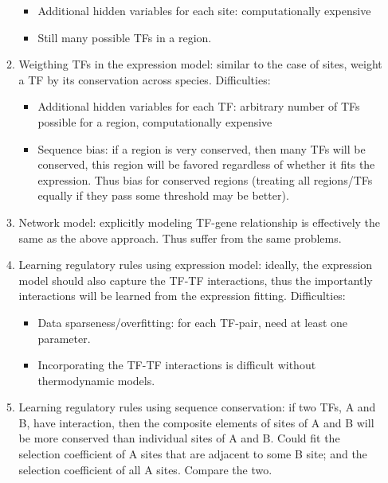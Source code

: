 \documentclass[11pt]{article}
\begin{document}
\begin{enumerate}
\begin{enumerate}
\begin{itemize}
\item Additional hidden variables for each site: computationally expensive
\item Still many possible TFs in a region. 
\end{itemize}
\item Weigthing TFs in the expression model: similar to the case of sites, weight a TF by its conservation across species. Difficulties: 
\begin{itemize}
\item Additional hidden variables for each TF: arbitrary number of TFs possible for a region, computationally expensive
\item Sequence bias: if a region is very conserved, then many TFs will be conserved, this region will be favored regardless of whether it fits the expression. Thus bias for conserved regions (treating all regions/TFs equally if they pass some threshold may be better). 
\end{itemize}
\item Network model: explicitly modeling TF-gene relationship is effectively the same as the above approach. Thus suffer from the same problems. 
\item Learning regulatory rules using expression model: ideally, the expression model should also capture the TF-TF interactions, thus the importantly interactions will be learned from the expression fitting. Difficulties: 
\begin{itemize}
\item Data sparseness/overfitting: for each TF-pair, need at least one parameter. 
\item Incorporating the TF-TF interactions is difficult without thermodynamic models. 
\end{itemize}
\item Learning regulatory rules using sequence conservation: if two TFs, A and B, have interaction, then the composite elements of sites of A and B will be more conserved than individual sites of A and B. Could fit the selection coefficient of A sites that are adjacent to some B site; and the selection coefficient of all A sites. Compare the two. 
\end{enumerate}


\end{enumerate}
\end{document}
